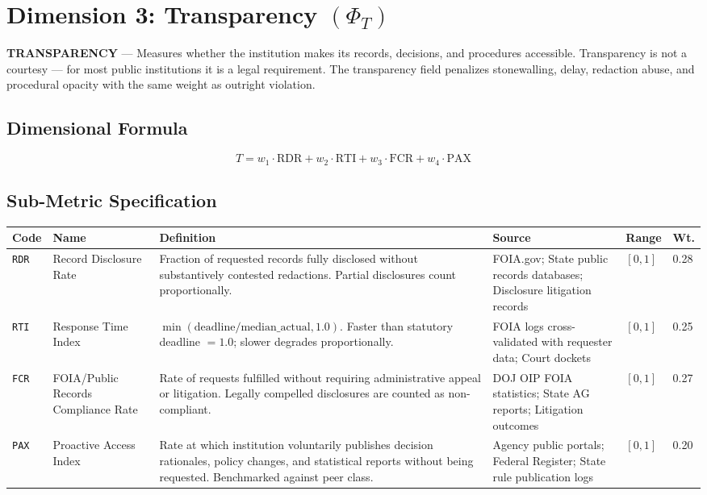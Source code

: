 \documentclass[a4paper,11pt]{article}
\begin{document}
	\newpage
	\section{Dimension 3: Transparency \texorpdfstring{$(\Phi_T)$}{}}
	
	\begin{dimensionbox}
		\textbf{\sffamily TRANSPARENCY} — Measures whether the institution makes its records, decisions, and procedures accessible. Transparency is not a courtesy — for most public institutions it is a legal requirement. The transparency field penalizes stonewalling, delay, redaction abuse, and procedural opacity with the same weight as outright violation.
	\end{dimensionbox}
	
	\subsection{Dimensional Formula}
	
	\[
	T = w_1 \cdot \text{RDR} + w_2 \cdot \text{RTI} + w_3 \cdot \text{FCR} + w_4 \cdot \text{PAX}
	\]
	
	\subsection{Sub-Metric Specification}
	
	\begin{longtable}{L{1.1cm} L{1.9cm} L{4.5cm} L{3.5cm} C{1.1cm} C{1.1cm}}
		\toprule
		\color{white}\textbf{\sffamily Code} & \color{white}\textbf{\sffamily Name} & \color{white}\textbf{\sffamily Definition} & \color{white}\textbf{\sffamily Source} & \color{white}\textbf{\sffamily Range} & \color{white}\textbf{\sffamily Wt.} \\
		\midrule
		\endhead
		\texttt{RDR} & Record Disclosure Rate & Fraction of requested records fully disclosed without substantively contested redactions. Partial disclosures count proportionally. & FOIA.gov; State public records databases; Disclosure litigation records & $[0,1]$ & 0.28 \\
		\midrule
		\texttt{RTI} & Response Time Index & $\min(\text{deadline}/\text{median\_actual}, 1.0)$. Faster than statutory deadline $= 1.0$; slower degrades proportionally. & FOIA logs cross-validated with requester data; Court dockets & $[0,1]$ & 0.25 \\
		\midrule
		\texttt{FCR} & FOIA/Public Records Compliance Rate & Rate of requests fulfilled without requiring administrative appeal or litigation. Legally compelled disclosures are counted as non-compliant. & DOJ OIP FOIA statistics; State AG reports; Litigation outcomes & $[0,1]$ & 0.27 \\
		\midrule
		\texttt{PAX} & Proactive Access Index & Rate at which institution voluntarily publishes decision rationales, policy changes, and statistical reports without being requested. Benchmarked against peer class. & Agency public portals; Federal Register; State rule publication logs & $[0,1]$ & 0.20 \\
		\bottomrule
	\end{longtable}
	
\end{document}

